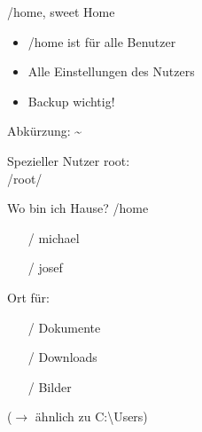 \begin{frame}{/home, sweet Home}

\begin{itemize}
	\item /home ist für alle Benutzer
	\item Alle Einstellungen des Nutzers
	\item Backup wichtig!
\end{itemize}

Abkürzung: \textasciitilde

\vfill

Spezieller Nutzer root:\\
/root/
\vfill

\end{frame}

\begin{frame}{Wo bin ich Hause?}
/home
\begin{itemize}
  \item [/] michael
  \item [/] josef
\end{itemize}
\vfill
Ort für:
\begin{itemize}
 \item [/] Dokumente
 \item [/] Downloads
 \item [/] Bilder
\end{itemize}
\vfill
($\longrightarrow$ ähnlich zu C:\textbackslash Users)

\vfill
\end{frame}
